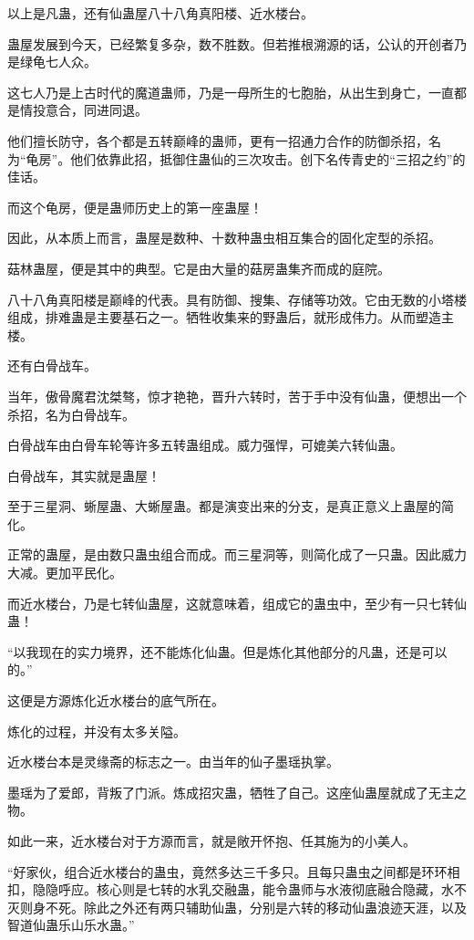 \begin{this_body}
以上是凡蛊，还有仙蛊屋八十八角真阳楼、近水楼台。

蛊屋发展到今天，已经繁复多杂，数不胜数。但若推根溯源的话，公认的开创者乃是绿龟七人众。

这七人乃是上古时代的魔道蛊师，乃是一母所生的七胞胎，从出生到身亡，一直都是情投意合，同进同退。

他们擅长防守，各个都是五转巅峰的蛊师，更有一招通力合作的防御杀招，名为“龟房”。他们依靠此招，抵御住蛊仙的三次攻击。创下名传青史的“三招之约”的佳话。

而这个龟房，便是蛊师历史上的第一座蛊屋！

因此，从本质上而言，蛊屋是数种、十数种蛊虫相互集合的固化定型的杀招。

菇林蛊屋，便是其中的典型。它是由大量的菇房蛊集齐而成的庭院。

八十八角真阳楼是巅峰的代表。具有防御、搜集、存储等功效。它由无数的小塔楼组成，排难蛊是主要基石之一。牺牲收集来的野蛊后，就形成伟力。从而塑造主楼。

还有白骨战车。

当年，傲骨魔君沈桀骜，惊才艳艳，晋升六转时，苦于手中没有仙蛊，便想出一个杀招，名为白骨战车。

白骨战车由白骨车轮等许多五转蛊组成。威力强悍，可媲美六转仙蛊。

白骨战车，其实就是蛊屋！

至于三星洞、蜥屋蛊、大蜥屋蛊。都是演变出来的分支，是真正意义上蛊屋的简化。

正常的蛊屋，是由数只蛊虫组合而成。而三星洞等，则简化成了一只蛊。因此威力大减。更加平民化。

而近水楼台，乃是七转仙蛊屋，这就意味着，组成它的蛊虫中，至少有一只七转仙蛊！

“以我现在的实力境界，还不能炼化仙蛊。但是炼化其他部分的凡蛊，还是可以的。”

这便是方源炼化近水楼台的底气所在。

炼化的过程，并没有太多关隘。

近水楼台本是灵缘斋的标志之一。由当年的仙子墨瑶执掌。

墨瑶为了爱郎，背叛了门派。炼成招灾蛊，牺牲了自己。这座仙蛊屋就成了无主之物。

如此一来，近水楼台对于方源而言，就是敞开怀抱、任其施为的小美人。

“好家伙，组合近水楼台的蛊虫，竟然多达三千多只。且每只蛊虫之间都是环环相扣，隐隐呼应。核心则是七转的水乳交融蛊，能令蛊师与水液彻底融合隐藏，水不灭则身不死。除此之外还有两只辅助仙蛊，分别是六转的移动仙蛊浪迹天涯，以及智道仙蛊乐山乐水蛊。”


\end{this_body}
